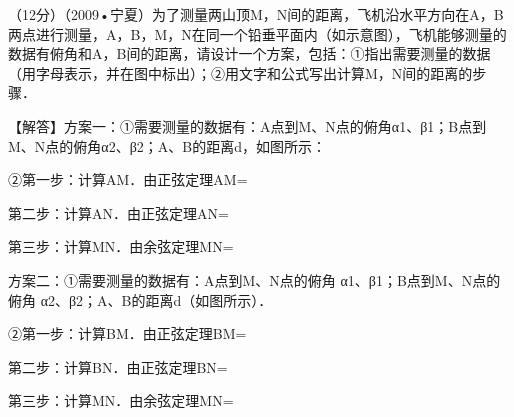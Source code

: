 \begin{question}
（12分）（2009•宁夏）为了测量两山顶M，N间的距离，飞机沿水平方向在A，B两点进行测量，A，B，M，N在同一个铅垂平面内（如示意图），飞机能够测量的数据有俯角和A，B间的距离，请设计一个方案，包括：①指出需要测量的数据（用字母表示，并在图中标出）；②用文字和公式写出计算M，N间的距离的步骤．\par
\begin{center}
\allowbreak{}
\end{center}
\begin{solution}
【解答】方案一：①需要测量的数据有：A点到M、N点的俯角α1、β1；B点到M、N点的俯角α2、β2；A、B的距离d，如图所示：\allowbreak{}\par
②第一步：计算AM．由正弦定理AM=\allowbreak{}\par
第二步：计算AN．由正弦定理AN=\allowbreak{}\par
第三步：计算MN．由余弦定理MN=\allowbreak{}\par
方案二：①需要测量的数据有：A点到M、N点的俯角 α1、β1；B点到M、N点的俯角 α2、β2；A、B的距离d（如图所示）．\par
②第一步：计算BM．由正弦定理BM=\allowbreak{}\par
第二步：计算BN．由正弦定理BN=\allowbreak{}\par
第三步：计算MN．由余弦定理MN=\allowbreak{}\par
\end{solution}
\end{question}

